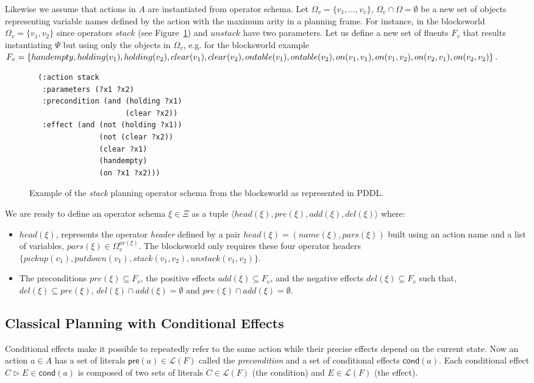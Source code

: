 \documentclass[letterpaper]{article} %
\newcommand{\tup}[1]{{\langle #1 \rangle}}
\newcommand{\pre}{\mathsf{pre}}     %
\newcommand{\cond}{\mathsf{cond}}   %
\begin{document}
Likewise we assume that actions in $A$ are instantiated from operator schema. Let $\Omega_v=\{v_1,\ldots,v_v\}$, $\Omega_v\cap\Omega=\emptyset$ be a new set of objects representing variable names defined by the action with the maximum arity in a planning frame. For instance, in the blocksworld $\Omega_v=\{v_1,v_2\}$ since operators $stack$ (see Figure~\ref{fig:stack}) and $unstack$ have two parameters. Let us define a new set of fluents $F_{v}$ that results instantiating $\Psi$ but using only the objects in $\Omega_v$, e.g. for the blocksworld example $F_v=\{handempty, holding(v_1), holding(v_2), clear(v_1), \\clear(v_2), ontable(v_1), ontable(v_2), on(v_1,v_1),on(v_1,v_2),\\on(v_2,v_1),on(v_2,v_2)\}$.

\begin{figure}[hbt]
\begin{footnotesize}
\begin{verbatim}
  (:action stack
   :parameters (?x1 ?x2)
   :precondition (and (holding ?x1) 
                      (clear ?x2))
   :effect (and (not (holding ?x1))
                (not (clear ?x2))
                (clear ?x1)
                (handempty)
                (on ?x1 ?x2)))
\end{verbatim}
\end{footnotesize}
 \caption{\small Example of the {\em stack} planning operator schema from the blocksworld as represented in PDDL.}
\label{fig:stack}
\end{figure}

We are ready to define an operator schema $\xi\in \Xi$ as a tuple $\tup{head(\xi),pre(\xi),add(\xi),del(\xi)}$ where:
\begin{itemize}
\item $head(\xi)$, represents the operator {\em header} defined by a pair $head(\xi)=(name(\xi),pars(\xi))$ built using an action name and a list of variables, $pars(\xi)\in\Omega_v^{ar(\xi)}$. The blocksworld only requires these four operator headers $\{pickup(v_1), putdown(v_1), stack(v_1,v_2), unstack(v_1,v_2)\}$.
\item The preconditions $pre(\xi)\subseteq F_v$, the positive effects $add(\xi)\subseteq F_v$, and the negative effects $del(\xi)\subseteq F_v$ such that, $del(\xi)\subseteq pre(\xi)$, $del(\xi)\cap add(\xi)=\emptyset$ and $pre(\xi)\cap add(\xi)=\emptyset$.
\end{itemize}


\subsection{Classical Planning with Conditional Effects}
Conditional effects make it possible to repeatedly refer to the same action while their precise effects depend on the current state. Now an action $a\in A$ has a set of literals $\pre(a)\in\mathcal{L}(F)$ called the {\em precondition} and a set of conditional effects $\cond(a)$. Each conditional effect $C\rhd E\in\cond(a)$ is composed of two sets of literals $C\in\mathcal{L}(F)$ (the condition) and $E\in\mathcal{L}(F)$ (the effect).
\end{document}

